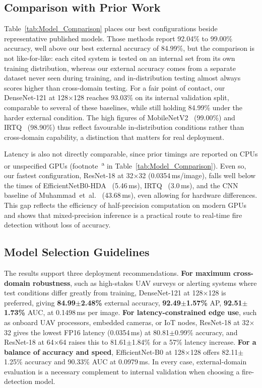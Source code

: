 \documentclass[conference]{IEEEtran}
\begin{document}
\subsection{Comparison with Prior Work}

Table~\ref{tab:Model_Comparison} places our best configurations beside representative published models. Those methods report 92.04\% to 99.00\% accuracy, well above our best external accuracy of 84.99\%, but the comparison is not like-for-like: each cited system is tested on an internal set from its own training distribution, whereas our external accuracy comes from a separate dataset never seen during training, and in-distribution testing almost always scores higher than cross-domain testing. For a fair point of contact, our DenseNet-121 at 128$\times$128 reaches 93.03\% on its internal validation split, comparable to several of these baselines, while still holding 84.99\% under the harder external condition. The high figures of MobileNetV2~\cite{mambile2025cnn} (99.00\%) and IRTQ~\cite{bukhari2025irtq} (98.90\%) thus reflect favourable in-distribution conditions rather than cross-domain capability, a distinction that matters for real deployment.

Latency is also not directly comparable, since prior timings are reported on CPUs or unspecified GPUs (footnote~\textsuperscript{a} in Table~\ref{tab:Model_Comparison}). Even so, our fastest configuration, ResNet-18 at 32$\times$32 (0.0354\,ms/image), falls well below the times of EfficientNetB0-HDA~\cite{elmadafri2024dual} (5.46\,ms), IRTQ~\cite{bukhari2025irtq} (3.0\,ms), and the CNN baseline of Muhammad~et~al.~\cite{muhammad2018efficient} (43.68\,ms), even allowing for hardware differences. This gap reflects the efficiency of half-precision computation on modern GPUs and shows that mixed-precision inference is a practical route to real-time fire detection without loss of accuracy.

\subsection{Model Selection Guidelines}

The results support three deployment recommendations. \textbf{For maximum cross-domain robustness}, such as high-stakes UAV surveys or alerting systems where test conditions differ greatly from training, DenseNet-121 at 128$\times$128 is preferred, giving \textbf{84.99$\pm$2.48\%} external accuracy, \textbf{92.49$\pm$1.57\%} AP, \textbf{92.51$\pm$1.73\%} AUC, at 0.1498\,ms per image. \textbf{For latency-constrained edge use}, such as onboard UAV processors, embedded cameras, or IoT nodes, ResNet-18 at 32$\times$32 gives the lowest FP16 latency (0.0354\,ms) at 80.81$\pm$0.99\% accuracy, and ResNet-18 at 64$\times$64 raises this to 81.61$\pm$1.84\% for a 57\% latency increase. \textbf{For a balance of accuracy and speed}, EfficientNet-B0 at 128$\times$128 offers 82.11$\pm$1.25\% accuracy and 90.33\% AUC at 0.0979\,ms. In every case, external-domain evaluation is a necessary complement to internal validation when choosing a fire-detection model.
\end{document}
